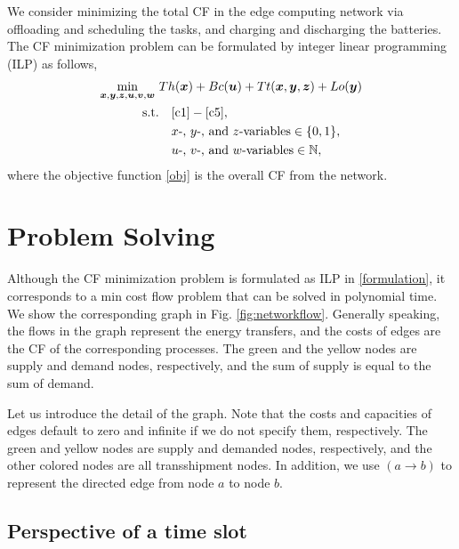 \documentclass[conference, 10pt, ﬁnal, letterpaper, twocolumn]{IEEEtran}
\begin{document}
We consider minimizing the total CF in the edge computing network via offloading and scheduling the tasks, and charging and discharging the batteries. The CF minimization problem can be formulated by integer linear programming (ILP) as follows,
\begin{subequations}\label{formulation}
    \begin{align}
         \mathop{\min}_{\boldsymbol{x}, \boldsymbol{y}, \boldsymbol{z}, \boldsymbol{u}, \boldsymbol{v}, \boldsymbol{w}} \ &Th(\boldsymbol{x}) +  Bc(\boldsymbol{u}) + Tt(\boldsymbol{x}, \boldsymbol{y}, \boldsymbol{z}) + Lo(\boldsymbol{y}) \label{obj}\\
         \text{s.t.} & \quad \eqref{c1} - \eqref{c5},\notag\\
         & \quad x\text{-}\text{, } y\text{-}\text{, and } z\text{-variables} \in \{0,1\},\\
         & \quad u\text{-}\text{, } v\text{-}\text{, and } w\text{-variables} \in \mathbb{N},
    \end{align}
\end{subequations}
where the objective function \eqref{obj} is the overall CF from the network.

\section{Problem Solving} 



Although the CF minimization problem is formulated as ILP in \eqref{formulation}, it corresponds to a min cost flow problem that can be solved in polynomial time. We show the corresponding graph in Fig. \ref{fig:networkflow}. Generally speaking, the flows in the graph represent the energy transfers, and the costs of edges are the CF of the corresponding processes. The green and the yellow nodes are supply and demand nodes, respectively, and the sum of supply is equal to the sum of demand.

Let us introduce the detail of the graph. Note that the costs and capacities of edges default to zero and infinite if we do not specify them, respectively. The green and yellow nodes are supply and demanded nodes, respectively, and the other colored nodes are all transshipment nodes. In addition, we use $(a\rightarrow b)$ to represent the directed edge from node $a$ to node $b$.

\subsection{Perspective of a time slot}
\end{document}
